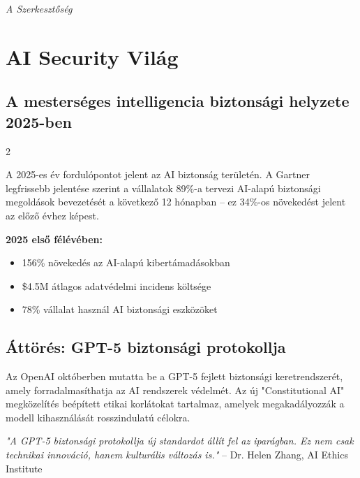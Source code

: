 \documentclass{../templates/magazine}
\begin{document}
\hfill \textit{A Szerkesztőség}

\newpage

\tableofcontents

\newpage

\section{AI Security Világ}

\subsection{A mesterséges intelligencia biztonsági helyzete 2025-ben}

\begin{multicols}{2}

A 2025-es év fordulópontot jelent az AI biztonság területén. A Gartner legfrissebb jelentése szerint a vállalatok 89\%-a tervezi AI-alapú biztonsági megoldások bevezetését a következő 12 hónapban -- ez 34\%-os növekedést jelent az előző évhez képest.

\columnbreak

\begin{infobox}[Statisztika]
\textbf{2025 első félévében:}
\begin{itemize}
    \item 156\% növekedés az AI-alapú kibertámadásokban
    \item \$4.5M átlagos adatvédelmi incidens költsége
    \item 78\% vállalat használ AI biztonsági eszközöket
\end{itemize}
\end{infobox}

\end{multicols}

\subsection{Áttörés: GPT-5 biztonsági protokollja}

Az OpenAI októberben mutatta be a GPT-5 fejlett biztonsági keretrendszerét, amely forradalmasíthatja az AI rendszerek védelmét. Az új "Constitutional AI" megközelítés beépített etikai korlátokat tartalmaz, amelyek megakadályozzák a modell kihasználását rosszindulatú célokra.

\begin{tipbox}
\textit{"A GPT-5 biztonsági protokollja új standardot állít fel az iparágban. Ez nem csak technikai innováció, hanem kulturális változás is."} -- Dr. Helen Zhang, AI Ethics Institute
\end{tipbox}
\end{document}
